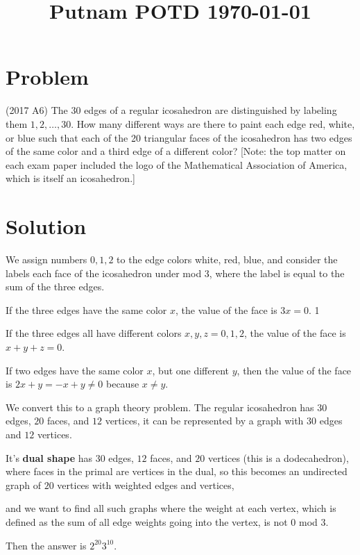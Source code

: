 \documentclass[amssymb,pra,12pt,aps,notitlepage]{revtex4-1}
\begin{document}
\title{Putnam POTD \today}
\maketitle

\section{Problem}
(2017 A6) The 30 edges of a regular icosahedron are distinguished by labeling them $1,2,\dots,30$. How many different ways 
are there to paint each edge red, white, or blue such that each of the 20 triangular faces of the icosahedron has two edges of the same color and a third edge of a different color? [Note: the top matter on each exam paper included the logo of the Mathematical Association of America, which is itself an icosahedron.]

\section{Solution}

We assign numbers $0,1,2$ to the edge colors white, red, blue, and consider 
the labels each face of the icosahedron under mod 3, where the label 
is equal to the sum of the three edges. 

If the three edges have the same color $x$, the 
value of the face is $3x = 0$. 1

If the three edges all have different colors $x,y,z = 0,1,2$, the 
value of the face is $x+y+z = 0$.

If two edges have the same color $x$, but one different $y$, then 
the value of the face is $2x+y = -x+y \neq 0$ because $x \neq y$. 

We convert this to a graph theory problem. 
The regular icosahedron has $30$ edges, $20$ faces, and $12$ vertices, it can be 
represented by a graph with $30$ edges and $12$ vertices. 

It's \textbf{dual shape} has $30$ edges, $12$ faces, and $20$ vertices (this is a dodecahedron),
where faces in the primal are vertices in the dual, 
so this becomes an undirected graph of $20$ vertices with weighted edges and vertices,

and we want to find all such graphs where the weight at each vertex, which 
is defined as the sum of all edge weights going into the vertex, is not 0 mod 3.

Then the answer is $2^{20} 3^{10}$. 
\end{document}

